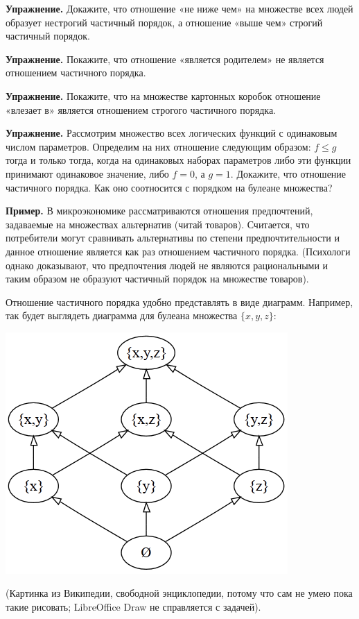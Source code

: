{\bfseries  Упражнение.} Докажите, что отношение «не ниже чем» на множестве всех людей образует нестрогий частичный порядок, а отношение «выше чем» строгий частичный порядок.

{\bfseries Упражнение.} Покажите, что отношение «является родителем» не является отношением частичного порядка.

{\bfseries Упражнение.} Покажите, что на множестве картонных коробок отношение «влезает в» является отношением строгого частичного порядка.

{\bfseries Упражнение.} Рассмотрим множество всех логических функций с одинаковым числом параметров. Определим на них отношение следующим образом: $f\le g$ тогда и только тогда, когда на одинаковых наборах параметров либо эти функции принимают одинаковое значение, либо $f=0$, а $g=1$. Докажите, что отношение частичного порядка. Как оно соотносится с порядком на булеане множества?

{\bfseries Пример.} В микроэкономике рассматриваются отношения предпочтений, задаваемые на множествах альтернатив (читай товаров). Считается, что потребители могут сравнивать альтернативы по степени предпочтительности и данное отношение является как раз отношением частичного порядка. (Психологи однако доказывают, что предпочтения людей не являются рациональными и таким образом не образуют частичный порядок на множестве товаров).

Отношение частичного порядка удобно представлять в виде диаграмм. Например, так будет выглядеть диаграмма для булеана множества $\{x, y, z\}$:

\includegraphics{hasse1.png}

(Картинка из Википедии, свободной энциклопедии, потому что сам не умею пока такие рисовать; LibreOffice Draw не справляется с задачей).

